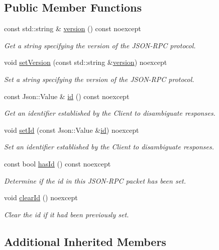 \subsection*{Public Member Functions}
\begin{DoxyCompactItemize}
\item 
const std\+::string \& \hyperlink{group___network_module_ga57b18a1db26df83b5d1769b6101ee67f}{version} () const noexcept
\begin{DoxyCompactList}\small\item\em Get a string specifying the version of the J\+S\+O\+N-\/\+R\+PC protocol. \end{DoxyCompactList}\item 
void \hyperlink{group___network_module_ga7bfca4f17a0916e6f1313b04496b9e0d}{set\+Version} (const std\+::string \&\hyperlink{group___network_module_ga57b18a1db26df83b5d1769b6101ee67f}{version}) noexcept
\begin{DoxyCompactList}\small\item\em Set a string specifying the version of the J\+S\+O\+N-\/\+R\+PC protocol. \end{DoxyCompactList}\item 
const Json\+::\+Value \& \hyperlink{group___network_module_ga76f1d35ffeff40b5df1874c68b97c89a}{id} () const noexcept
\begin{DoxyCompactList}\small\item\em Get an identifier established by the Client to disambiguate responses. \end{DoxyCompactList}\item 
void \hyperlink{group___network_module_gaf71b65c7bb55adbf936c38ffd1cd8289}{set\+Id} (const Json\+::\+Value \&\hyperlink{group___network_module_ga76f1d35ffeff40b5df1874c68b97c89a}{id}) noexcept
\begin{DoxyCompactList}\small\item\em Set an identifier established by the Client to disambiguate responses. \end{DoxyCompactList}\item 
const bool \hyperlink{group___network_module_gaef8ff7e1ae84dc613d31615fa973a521}{has\+Id} () const noexcept
\begin{DoxyCompactList}\small\item\em Determine if the id in this J\+S\+O\+N-\/\+R\+PC packet has been set. \end{DoxyCompactList}\item 
void \hyperlink{group___network_module_gaa92eeabe2c022b96d2820a02118dc1b2}{clear\+Id} () noexcept
\begin{DoxyCompactList}\small\item\em Clear the id if it had been previously set. \end{DoxyCompactList}\end{DoxyCompactItemize}
\subsection*{Additional Inherited Members}
